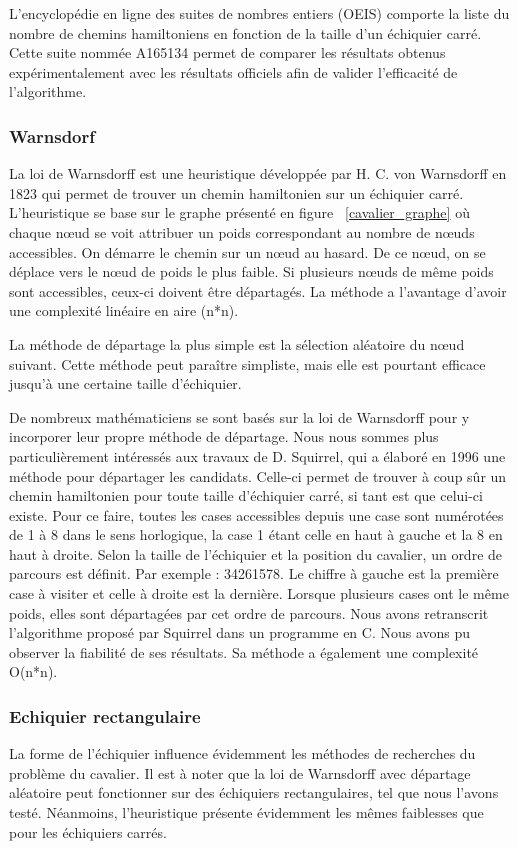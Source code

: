 L'encyclopédie en ligne des suites de nombres entiers (OEIS) comporte la liste du nombre de chemins hamiltoniens en fonction de la taille d’un échiquier carré. Cette suite nommée A165134 permet de comparer les résultats obtenus expérimentalement avec les résultats officiels afin de valider l’efficacité de l’algorithme.
\subsubsection{Warnsdorf}
La loi de Warnsdorff est une heuristique développée par H. C. von Warnsdorff en 1823 qui permet de trouver un chemin hamiltonien sur un échiquier carré. L'heuristique se base sur le graphe présenté en figure ~\ref{cavalier_graphe} où chaque nœud se voit attribuer un poids correspondant au nombre de nœuds accessibles. On démarre le chemin sur un nœud au hasard. De ce nœud, on se déplace vers le nœud de poids le plus faible. Si plusieurs nœuds de même poids sont accessibles, ceux-ci doivent être départagés. La méthode a l'avantage d'avoir une complexité linéaire en aire (n*n). 

La méthode de départage la plus simple est la sélection aléatoire du nœud suivant. Cette méthode peut paraître simpliste, mais elle est pourtant efficace jusqu'à une certaine taille d'échiquier.

De nombreux mathématiciens se sont basés sur la loi de Warnsdorff pour y incorporer leur propre méthode de départage. Nous nous sommes plus particulièrement intéressés aux travaux de D. Squirrel, qui a élaboré en 1996 une méthode pour départager les candidats. Celle-ci permet de trouver à coup sûr un chemin hamiltonien pour toute taille d'échiquier carré, si tant est que celui-ci existe. Pour ce faire, toutes les cases accessibles depuis une case sont numérotées de 1 à 8 dans le sens horlogique, la case 1 étant celle en haut à gauche et la 8 en haut à droite. Selon la taille de l'échiquier et la position du cavalier, un ordre de parcours est définit. Par exemple : 34261578. Le chiffre à gauche est la première case à visiter et celle à droite est la dernière. Lorsque plusieurs cases ont le même poids, elles sont départagées par cet ordre de parcours. Nous avons retranscrit l'algorithme proposé par Squirrel dans un programme en C. Nous avons pu observer la fiabilité de ses résultats. Sa méthode a également une complexité O(n*n).
\subsubsection{Echiquier rectangulaire}
La forme de l'échiquier influence évidemment les méthodes de recherches du problème du cavalier. Il est à noter que la loi de Warnsdorff avec départage aléatoire peut fonctionner sur des échiquiers rectangulaires, tel que nous l'avons testé. Néanmoins, l'heuristique présente évidemment les mêmes faiblesses que pour les échiquiers carrés.


